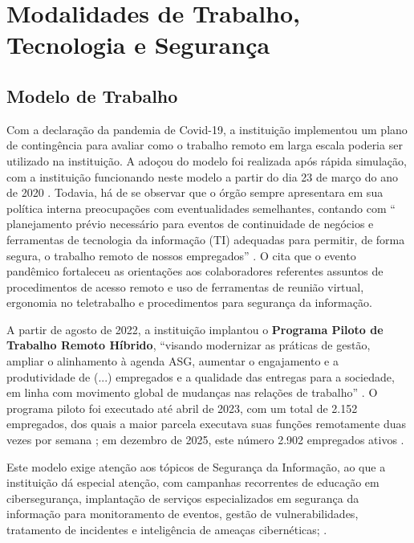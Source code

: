 \section{Modalidades de Trabalho, Tecnologia e Segurança}

\subsection{Modelo de Trabalho}

Com a declaração da pandemia de Covid-19, a instituição implementou um plano de contingência para avaliar como o trabalho remoto em larga escala poderia ser utilizado na instituição. A adoçou do modelo foi realizada após rápida simulação, com a instituição funcionando neste modelo a partir do dia 23 de março do ano de 2020 \cite{bndes_ra2020}. Todavia, há de se observar que o órgão sempre apresentara em sua política interna preocupações com eventualidades semelhantes, contando com `` planejamento prévio necessário para eventos de continuidade de negócios e ferramentas de tecnologia da informação (TI) adequadas para permitir, de forma segura, o trabalho remoto de nossos empregados'' \cite{bndes_ra2020}. O  cita que o evento pandêmico fortaleceu as orientações aos colaboradores referentes assuntos de  procedimentos de acesso remoto e uso de ferramentas de reunião virtual, ergonomia no teletrabalho e procedimentos para segurança da informação.

A partir de agosto de 2022, a instituição implantou o \textbf{Programa Piloto de Trabalho Remoto Híbrido}, ``visando modernizar as práticas de gestão, ampliar o alinhamento à agenda ASG, aumentar o engajamento e a produtividade de (...) empregados e a qualidade das entregas para a sociedade, em linha com movimento global de mudanças nas relações de trabalho'' \cite{bndes_ra2022}. O programa piloto foi executado até abril de 2023, com um total de 2.152 empregados, dos quais a maior parcela executava suas funções remotamente duas vezes por semana \cite{bndes_ra2024}; em dezembro de 2025, este número 2.902 empregados ativos \cite{bndes_ra2025}.

Este modelo exige atenção aos tópicos de Segurança da Informação, ao que a instituição dá especial atenção, com campanhas recorrentes de educação em cibersegurança,  implantação de serviços especializados em segurança da informação para monitoramento de eventos, gestão de vulnerabilidades, tratamento de incidentes e inteligência de ameaças cibernéticas; \cite{bndes_ra2025}. 

